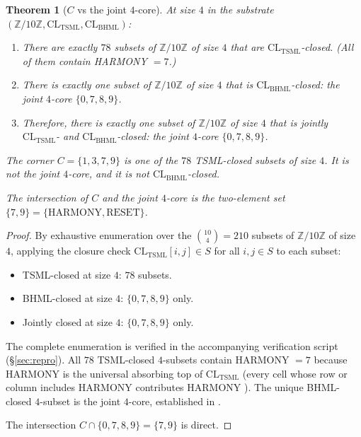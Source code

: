 \documentclass[11pt,reqno]{amsart}
\theoremstyle{plain}
\newtheorem{theorem}{Theorem}[section]
\theoremstyle{definition}
\theoremstyle{remark}
\newcommand{\Z}{\mathbb{Z}}
\newcommand{\TSML}{\mathrm{TSML}}
\newcommand{\BHML}{\mathrm{BHML}}
\begin{document}
\begin{theorem}[$C$ vs the joint $4$-core]\label{thm:two-cores-revised}
At size $4$ in the substrate $(\Z/10\Z, \mathrm{CL}_\TSML,
\mathrm{CL}_\BHML)$:
\begin{enumerate}
\item There are exactly $78$ subsets of $\Z/10\Z$ of size $4$ that are
$\mathrm{CL}_\TSML$-closed.  (All of them contain HARMONY $=7$.)
\item There is exactly one subset of $\Z/10\Z$ of size $4$ that is
$\mathrm{CL}_\BHML$-closed: the joint $4$-core $\{0, 7, 8, 9\}$.
\item Therefore, there is exactly one subset of $\Z/10\Z$ of size $4$
that is jointly $\mathrm{CL}_\TSML$- and $\mathrm{CL}_\BHML$-closed:
the joint $4$-core $\{0, 7, 8, 9\}$.
\end{enumerate}
The corner $C = \{1, 3, 7, 9\}$ is one of the $78$ TSML-closed
subsets of size $4$.  It is not the joint $4$-core, and it is not
$\mathrm{CL}_\BHML$-closed.

The intersection of $C$ and the joint $4$-core is the two-element set
$\{7, 9\} = \{\mathrm{HARMONY}, \mathrm{RESET}\}$.
\end{theorem}

\begin{proof}
By exhaustive enumeration over the $\binom{10}{4} = 210$ subsets of
$\Z/10\Z$ of size $4$, applying the closure check
$\mathrm{CL}_\TSML[i, j] \in S$ for all $i, j \in S$ to each subset:
\begin{itemize}
\item TSML-closed at size $4$: $78$ subsets.
\item BHML-closed at size $4$: $\{0, 7, 8, 9\}$ only.
\item Jointly closed at size $4$: $\{0, 7, 8, 9\}$ only.
\end{itemize}
The complete enumeration is verified in the accompanying
verification script (\S\ref{sec:repro}).  All $78$ TSML-closed
$4$-subsets contain HARMONY $=7$ because HARMONY is the universal
absorbing top of $\mathrm{CL}_\TSML$ (every cell whose row or column
includes HARMONY contributes HARMONY \cite[\S 5]{SandersForcing}).
The unique BHML-closed $4$-subset is the joint $4$-core, established
in \cite[Theorem 1]{SandersGishFourCore}.

The intersection $C \cap \{0, 7, 8, 9\} = \{7, 9\}$ is direct.
\end{proof}
\end{document}

